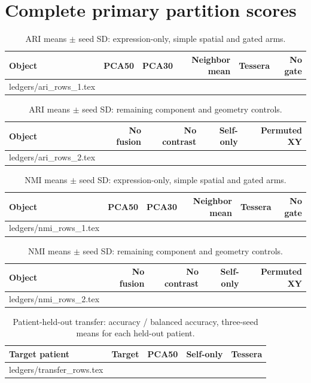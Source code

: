 \documentclass[11pt]{article}
\makeatletter
\let\tableinput\@@input
\makeatother
\begin{document}
\section*{Complete primary partition scores}
\begin{table}[ht]\centering\scriptsize\setlength{\tabcolsep}{4pt}
\caption{ARI means $\pm$ seed SD: expression-only, simple spatial and gated arms.}
\begin{tabular}{lrrrrr}\toprule
Object & PCA50 & PCA30 & Neighbor mean & Tessera & No gate\\\midrule
\tableinput ledgers/ari_rows_1.tex
\bottomrule\end{tabular}\end{table}
\begin{table}[ht]\centering\scriptsize\setlength{\tabcolsep}{5pt}
\caption{ARI means $\pm$ seed SD: remaining component and geometry controls.}
\begin{tabular}{lrrrr}\toprule
Object & No fusion & No contrast & Self-only & Permuted XY\\\midrule
\tableinput ledgers/ari_rows_2.tex
\bottomrule\end{tabular}\end{table}
\begin{table}[ht]\centering\scriptsize\setlength{\tabcolsep}{4pt}
\caption{NMI means $\pm$ seed SD: expression-only, simple spatial and gated arms.}
\begin{tabular}{lrrrrr}\toprule
Object & PCA50 & PCA30 & Neighbor mean & Tessera & No gate\\\midrule
\tableinput ledgers/nmi_rows_1.tex
\bottomrule\end{tabular}\end{table}
\begin{table}[ht]\centering\scriptsize\setlength{\tabcolsep}{5pt}
\caption{NMI means $\pm$ seed SD: remaining component and geometry controls.}
\begin{tabular}{lrrrr}\toprule
Object & No fusion & No contrast & Self-only & Permuted XY\\\midrule
\tableinput ledgers/nmi_rows_2.tex
\bottomrule\end{tabular}\end{table}
\clearpage
\begin{table}[ht]\centering\small\setlength{\tabcolsep}{7pt}
\caption{Patient-held-out transfer: accuracy / balanced accuracy, three-seed means for each held-out patient.}
\begin{tabular}{llrrr}\toprule
Target patient & Target & PCA50 & Self-only & Tessera\\\midrule
\tableinput ledgers/transfer_rows.tex
\bottomrule\end{tabular}\end{table}
\end{document}
